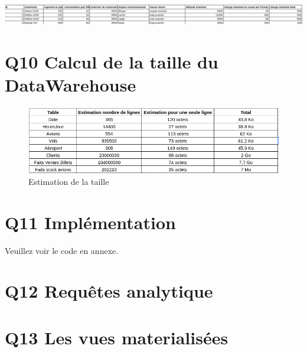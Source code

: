 \documentclass[oneside,13pt,a4paper]{article}
\begin{document}
  
  \includegraphics[width=1\textwidth]{img/avion.png}
  

\section{Q10 Calcul de la taille du DataWarehouse}

\begin{figure}[h]
  \centering
  \includegraphics[width=1\textwidth]{img/estimation_taille.png}
  \caption{Estimation de la taille}
\end{figure}

\section{Q11 Implémentation}

Veuillez voir le code en annexe.

\section{Q12 Requêtes analytique}

\section{Q13 Les vues materialisées}
\end{document}
